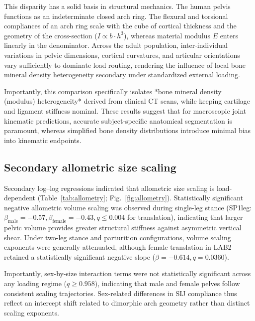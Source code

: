 This disparity has a solid basis in structural mechanics. The human pelvis functions as an indeterminate closed arch ring. The flexural and torsional compliances of an arch ring scale with the cube of cortical thickness and the geometry of the cross-section ($I \propto b\cdot h^3$), whereas material modulus $E$ enters linearly in the denominator. Across the adult population, inter-individual variations in pelvic dimensions, cortical curvatures, and articular orientations vary sufficiently to dominate load routing, rendering the influence of local bone mineral density heterogeneity secondary under standardized external loading.

Importantly, this comparison specifically isolates *bone mineral density (modulus) heterogeneity* derived from clinical CT scans, while keeping cartilage and ligament stiffness nominal. These results suggest that for macroscopic joint kinematic predictions, accurate subject-specific anatomical segmentation is paramount, whereas simplified bone density distributions introduce minimal bias into kinematic endpoints.

\subsection*{Secondary allometric size scaling}
Secondary log--log regressions indicated that allometric size scaling is load-dependent (Table~\ref{tab:allometry}; Fig.~\ref{fig:allometry}). Statistically significant negative allometric volume scaling was observed during single-leg stance (SP1leg: $\beta_{\text{male}} = -0.57, \beta_{\text{female}} = -0.43, q \le 0.004$ for translation), indicating that larger pelvic volume provides greater structural stiffness against asymmetric vertical shear. Under two-leg stance and parturition configurations, volume scaling exponents were generally attenuated, although female translation in LAB2 retained a statistically significant negative slope ($\beta = -0.614, q = 0.0360$).

Importantly, sex-by-size interaction terms were not statistically significant across any loading regime ($q \ge 0.958$), indicating that male and female pelves follow consistent scaling trajectories. Sex-related differences in SIJ compliance thus reflect an intercept shift related to dimorphic arch geometry rather than distinct scaling exponents.

